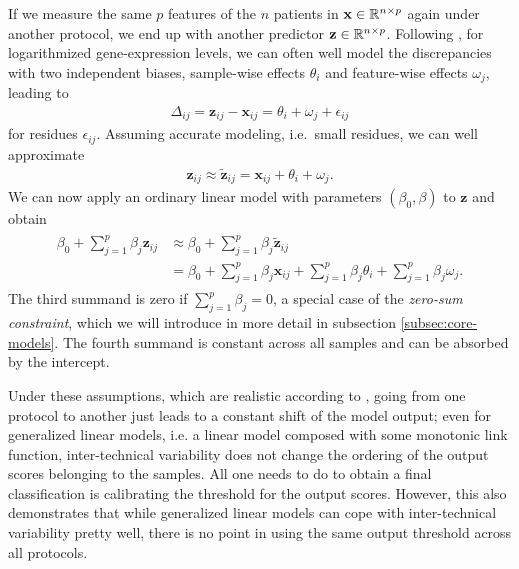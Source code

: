 If we 
measure the same $p$ features of the $n$ patients in $\mathbf{x} \in \mathbb{R}^{n \times p}$ again under 
another protocol, we end up with another predictor 
$\mathbf{z} \in \mathbb{R}^{n \times p}$.
Following \cite{transplatform17}, for logarithmized gene-expression levels,
we can often well model the discrepancies with two independent biases, sample-wise effects $\theta_i$
and feature-wise effects $\omega_j$, leading to
\begin{align}\label{eq:inter-tech-exact}
    \Delta_{ij} = \mathbf{z}_{ij} - \mathbf{x}_{ij} = \theta_i + \omega_j + \epsilon_{ij}
\end{align}
for residues $\epsilon_{ij}$. Assuming accurate modeling, i.e.\ small residues, we can well approximate
\begin{align}
    \mathbf{z}_{ij} \approx \tilde{\mathbf{z}}_{ij} = \mathbf{x}_{ij} + \theta_i + \omega_j.
\end{align}
We can now apply an ordinary linear model with parameters $(\beta_0, \beta)$ to $\mathbf{z}$ 
and obtain
\begin{align} \label{eq:inter-tech}
\begin{split}
    \beta_0 + \sum_{j=1}^p \beta_j \mathbf{z}_{ij} &\approx \beta_0 + \sum_{j=1}^p \beta_j \tilde{\mathbf{z}}_{ij} \\
    &= \beta_0 + \sum_{j=1}^p \beta_j \mathbf{x}_{ij} + \sum_{j=1}^p \beta_j \theta_i + \sum_{j=1}^p \beta_j \omega_j.
\end{split}
\end{align}
The third summand is zero if $\sum_{j = 1}^p \beta_j = 0$, a special case of the \textit{zero-sum 
constraint}, which we will introduce in more detail in subsection \ref{subsec:core-models}. 
The fourth summand is constant across all samples and can be absorbed by the intercept. 

Under these assumptions, which are realistic according to \cite{transplatform17},
going from one protocol to another just leads to a constant shift of the model 
output; even for generalized linear models, i.e. a linear model composed with some monotonic link 
function, inter-technical variability does not change the ordering of the output scores belonging 
to the samples. All one needs to do to 
obtain a final classification is calibrating the threshold for the output scores. However, this 
also demonstrates that while generalized linear models can cope with inter-technical variability 
pretty well, there is no point in using the same output threshold across all protocols.

